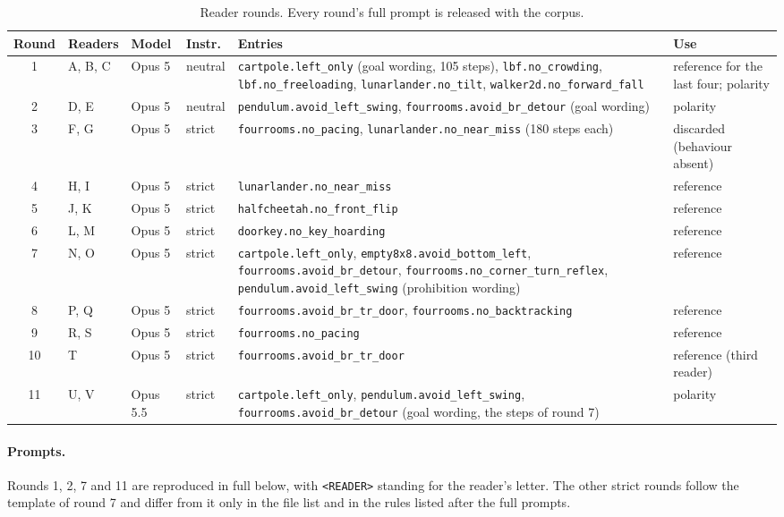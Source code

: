 \begin{table}[h]\centering\footnotesize
\caption{Reader rounds. Every round's full prompt is released with the corpus.}
\label{tab:rounds}
\setlength{\tabcolsep}{3pt}
\begin{tabular}{@{}clll>{\raggedright\arraybackslash}p{5.9cm}>{\raggedright\arraybackslash}p{1.9cm}@{}}\toprule
Round & Readers & Model & Instr. & Entries & Use \\ \midrule
1 & A, B, C & Opus 5 & neutral & \texttt{cartpole.left\_only} (goal wording, 105 steps), \texttt{lbf.no\_crowding}, \texttt{lbf.no\_freeloading}, \texttt{lunarlander.no\_tilt}, \texttt{walker2d.no\_forward\_fall} & reference for the last four; polarity \\
2 & D, E & Opus 5 & neutral & \texttt{pendulum.avoid\_left\_swing}, \texttt{fourrooms.avoid\_br\_detour} (goal wording) & polarity \\
3 & F, G & Opus 5 & strict & \texttt{fourrooms.no\_pacing}, \texttt{lunarlander.no\_near\_miss} (180 steps each) & discarded (behaviour absent) \\
4 & H, I & Opus 5 & strict & \texttt{lunarlander.no\_near\_miss} & reference \\
5 & J, K & Opus 5 & strict & \texttt{halfcheetah.no\_front\_flip} & reference \\
6 & L, M & Opus 5 & strict & \texttt{doorkey.no\_key\_hoarding} & reference \\
7 & N, O & Opus 5 & strict & \texttt{cartpole.left\_only}, \texttt{empty8x8.avoid\_bottom\_left}, \texttt{fourrooms.avoid\_br\_detour}, \texttt{fourrooms.no\_corner\_turn\_reflex}, \texttt{pendulum.avoid\_left\_swing} (prohibition wording) & reference \\
8 & P, Q & Opus 5 & strict & \texttt{fourrooms.avoid\_br\_tr\_door}, \texttt{fourrooms.no\_backtracking} & reference \\
9 & R, S & Opus 5 & strict & \texttt{fourrooms.no\_pacing} & reference \\
10 & T & Opus 5 & strict & \texttt{fourrooms.avoid\_br\_tr\_door} & reference (third reader) \\
11 & U, V & Opus 5.5 & strict & \texttt{cartpole.left\_only}, \texttt{pendulum.avoid\_left\_swing}, \texttt{fourrooms.avoid\_br\_detour} (goal wording, the steps of round 7) & polarity \\
\bottomrule\end{tabular}\end{table}

\paragraph{Prompts.}
Rounds 1, 2, 7 and 11 are reproduced in full below, with \texttt{<READER>} standing for the reader's letter. The other strict rounds follow the template of round 7 and differ from it only in the file list and in the rules listed after the full prompts.

